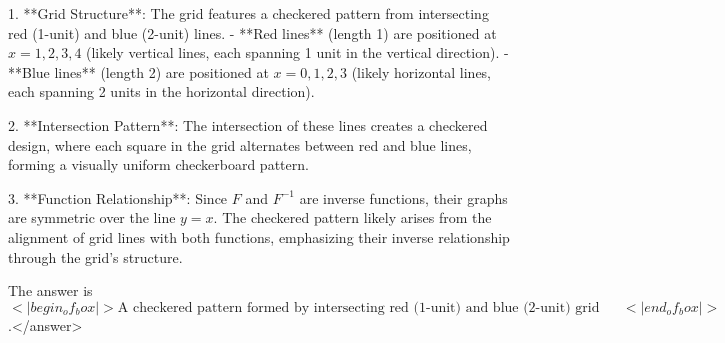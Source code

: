 1. **Grid Structure**: The grid features a checkered pattern from intersecting red (1-unit) and blue (2-unit) lines.  
   - **Red lines** (length 1) are positioned at \( x = 1, 2, 3, 4 \) (likely vertical lines, each spanning 1 unit in the vertical direction).  
   - **Blue lines** (length 2) are positioned at \( x = 0, 1, 2, 3 \) (likely horizontal lines, each spanning 2 units in the horizontal direction).  

2. **Intersection Pattern**: The intersection of these lines creates a checkered design, where each square in the grid alternates between red and blue lines, forming a visually uniform checkerboard pattern.  

3. **Function Relationship**: Since \( F \) and \( F^{-1} \) are inverse functions, their graphs are symmetric over the line \( y = x \). The checkered pattern likely arises from the alignment of grid lines with both functions, emphasizing their inverse relationship through the grid’s structure.  

The answer is \(<|begin_of_box|>\text{A checkered pattern formed by intersecting red (1-unit) and blue (2-unit) grid lines, symmetric to the inverse function relationship}<|end_of_box|>\).</answer>